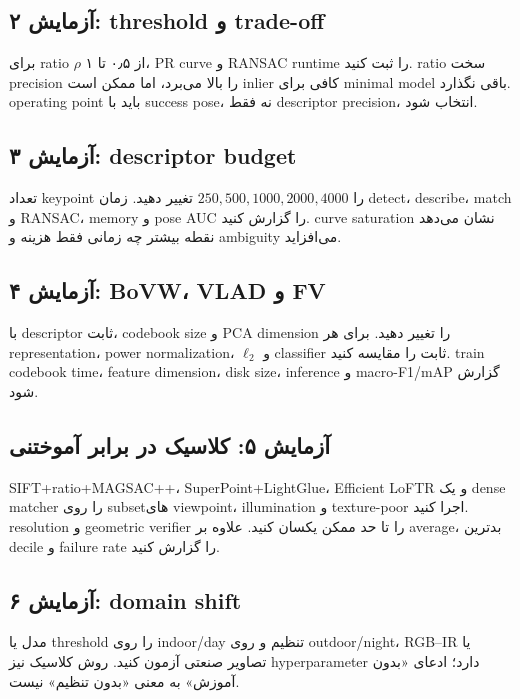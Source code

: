 \documentclass[12pt,openany,oneside]{book}
\begin{document}
\subsection{آزمایش ۲: threshold و trade-off}
برای ratio $\rho$ از ۰٫۵ تا ۱، PR curve و RANSAC runtime را ثبت کنید. ratio سخت precision را بالا می‌برد، اما ممکن است inlier کافی برای minimal model باقی نگذارد. operating point باید با success pose، نه فقط descriptor precision، انتخاب شود.

\subsection{آزمایش ۳: descriptor budget}
تعداد keypoint را $250,500,1000,2000,4000$ تغییر دهید. زمان detect، describe، match و RANSAC، memory و pose AUC را گزارش کنید. curve saturation نشان می‌دهد نقطه بیشتر چه زمانی فقط هزینه و ambiguity می‌افزاید.

\subsection{آزمایش ۴: BoVW، VLAD و FV}
با descriptor ثابت، codebook size و PCA dimension را تغییر دهید. برای هر representation، power normalization، $\ell_2$ و classifier ثابت را مقایسه کنید. train codebook time، feature dimension، disk size، inference و macro-F1/mAP گزارش شود.

\subsection{آزمایش ۵: کلاسیک در برابر آموختنی}
SIFT+ratio+MAGSAC++، SuperPoint+LightGlue، Efficient LoFTR و یک dense matcher را روی subsetهای viewpoint، illumination و texture-poor اجرا کنید. resolution و geometric verifier را تا حد ممکن یکسان کنید. علاوه بر average، بدترین decile و failure rate را گزارش کنید.

\subsection{آزمایش ۶: domain shift}
مدل یا threshold را روی indoor/day تنظیم و روی outdoor/night، RGB--IR یا تصاویر صنعتی آزمون کنید. روش کلاسیک نیز hyperparameter دارد؛ ادعای «بدون آموزش» به معنی «بدون تنظیم» نیست.
\end{document}
